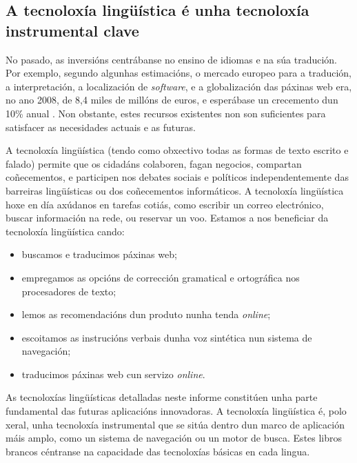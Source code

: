 \begin{multicols}{2}
\subsection{A tecnoloxía lingüística é unha tecnoloxía instrumental clave}

   No pasado, as inversións centrábanse no ensino de idiomas e na súa tradución. Por exemplo, segundo algunhas estimacións, o mercado europeo para a tradución, a interpretación, a localización de \textit{software}, e a globalización das páxinas web era, no ano 2008, de 8,4 miles de millóns de euros, e esperábase un crecemento dun 10\% anual \cite{GAL-Nota4}.  Non obstante, estes recursos existentes non son suficientes para satisfacer as necesidades actuais e as futuras. 

A tecnoloxía lingüística  (tendo como obxectivo todas as formas de texto escrito e falado)  permite que os cidadáns colaboren, fagan negocios, compartan coñecementos, e participen nos debates sociais e políticos independentemente das barreiras lingüísticas ou dos coñecementos informáticos.  A tecnoloxía lingüística hoxe en día axúdanos en tarefas cotiás, como escribir un correo electrónico, buscar información na rede, ou reservar un voo. Estamos a nos beneficiar da tecnoloxía lingüística cando:

\begin{itemize}
   \item buscamos e traducimos páxinas web;  
   \item empregamos as opcións de corrección gramatical e ortográfica nos procesadores de texto;
   \item lemos as recomendacións dun produto nunha tenda \textit{online};
   \item escoitamos as instrucións verbais dunha voz sintética nun sistema de navegación; 
   \item traducimos páxinas web cun servizo \textit{online}.
\end{itemize}

As tecnoloxías lingüísticas detalladas neste informe constitúen unha parte fundamental das futuras aplicacións innovadoras. A tecnoloxía lingüística é, polo xeral, unha tecnoloxía instrumental que se sitúa dentro dun marco de aplicación máis amplo, como un sistema de navegación ou un motor de busca. Estes libros brancos céntranse na capacidade das tecnoloxías básicas en cada lingua. 



\end{multicols}
